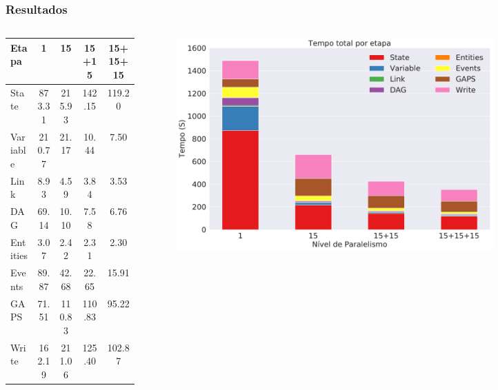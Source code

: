 \documentclass{beamer}
\begin{document}
\begin{frame}
 \frametitle{Resultados}
  \begin{columns}[T] %
  \begin{column}{.40\textwidth}
  \begin{table}[ht]
  \tiny
  \begin{tabular}{l c c c c} \toprule
  \textbf{Etapa}  & \textbf{1} & \textbf{15} & \textbf{15+15} & 
  \textbf{15+15+15}\\ 
  \midrule
  State		& 873.31 & 215.93 & 142.15 & 119.20\\
  Variable  	& 210.77 & 21.17  & 10.44  & 7.50 \\
  Link      	& 8.93   & 4.59   & 3.84   & 3.53 \\
  DAG        	& 69.14  & 10.10  & 7.58   & 6.76 \\
  Entities	& 3.07   & 2.42   & 2.31   & 2.30 \\
  Events		& 89.87  & 42.68  & 22.65  & 15.91\\
  GAPS		& 71.51  & 110.83 & 110.83 & 95.22\\
  Write		& 162.19 & 211.06 & 125.40 & 102.87\\
  \end{tabular}
  \label{tab:total_step}
  \end{table}
  \end{column}%
  \hfill%
  \begin{column}{.56\textwidth}
  \begin{figure}[H]
  \centerline{
  \includegraphics[width=0.8\textwidth]{./img/total_step.pdf}}
  \label{fig:total_step}
  \end{figure}
  \end{column}%
  \end{columns}
\end{frame}
\end{document}
